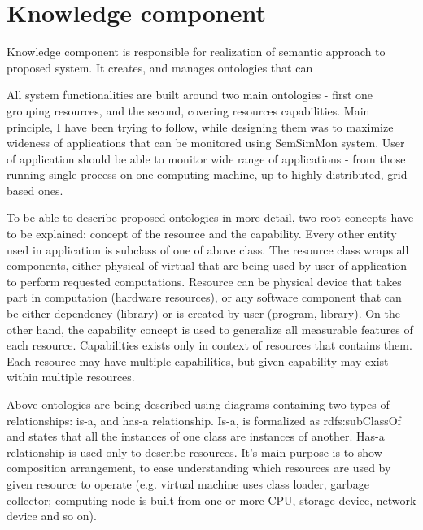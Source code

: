 %


\section{Knowledge component}
\label{sec:arch_knowledge}
 

Knowledge component is responsible for realization of semantic approach to proposed system. It creates, and manages
ontologies that can 


All system functionalities are built around two main ontologies - first one grouping resources, and the second, covering
resources capabilities. Main principle, I have been trying to follow, while designing them was to maximize wideness of
applications that can be monitored using SemSimMon system. User of application should be able to monitor wide range of
applications - from those running single process on one computing machine, up to highly distributed, grid-based ones.

To be able to describe proposed ontologies in more detail, two root concepts have to be explained: concept of the
resource and the capability. Every other entity used in application is subclass of one of above class. The resource
class wraps all components, either physical of virtual that are being used by user of application to
perform requested computations. Resource can be physical device that takes part in computation (hardware
resources), or any software component that can be either dependency (library) or is created by user (program, library).
On the other hand, the capability concept is used to generalize all measurable features of each resource. Capabilities
exists only in context of resources that contains them. Each resource may have multiple capabilities, but given
capability may exist within multiple resources.

Above ontologies are being described using diagrams containing two types of relationships: is-a, and has-a
relationship. Is-a, is formalized as rdfs:subClassOf and states that all the instances of one class are instances of
another\cite{rdfRef:2004}. Has-a relationship is used only to describe resources. It's main purpose is to show
composition arrangement, to ease understanding which resources are used by given resource to operate (e.g. virtual
machine uses class loader, garbage collector; computing node is built from one or more CPU, storage device, network
device and so on).

